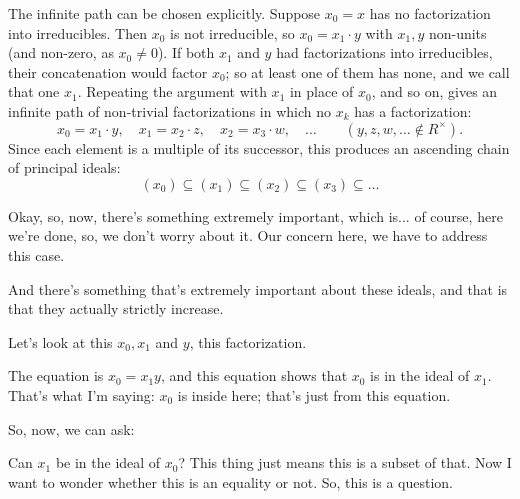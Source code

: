 \begin{proofWrapper}
\begin{content}
\begin{center}
\end{center}

The infinite path can be chosen explicitly. Suppose $x_0 = x$ has no factorization into irreducibles. Then $x_0$ is not irreducible, so $x_0 = x_1 \cdot y$ with $x_1, y$ non-units (and non-zero, as $x_0 \neq 0$). If both $x_1$ and $y$ had factorizations into irreducibles, their concatenation would factor $x_0$; so at least one of them has none, and we call that one $x_1$. Repeating the argument with $x_1$ in place of $x_0$, and so on, gives an infinite path of non-trivial factorizations in which no $x_k$ has a factorization:
\begin{equation}\label{eq:part3-infinite-factorization-chain}
x_0 = x_1 \cdot y, \quad x_1 = x_2 \cdot z, \quad x_2 = x_3 \cdot w, \quad \dots \qquad (y, z, w, \ldots \notin R^\times).
\end{equation}
Since each element is a multiple of its successor, this produces an ascending chain of principal ideals:
\begin{equation}\label{eq:part3-ascending-chain-prelim}
(x_0) \subseteq (x_1) \subseteq (x_2) \subseteq (x_3) \subseteq \dots
\end{equation}
\end{content}

\begin{speech}[01:06:02 - 01:07:12]
Okay, so, now, there's something extremely important, which is... of course, here we're done, so, we don't worry about it. Our concern here, we have to address this case. 

And there's something that's extremely important about these ideals, and that is that they actually strictly increase. 

Let's look at this $x_0, x_1$ and $y$, this factorization. 

The equation is $x_0 = x_1 y$, and this equation shows that $x_0$ is in the ideal of $x_1$. That's what I'm saying: $x_0$ is inside here; that's just from this equation.

So, now, we can ask: 

Can $x_1$ be in the ideal of $x_0$? This thing just means this is a subset of that. Now I want to wonder whether this is an equality or not. So, this is a question.
\end{speech}


\end{proofWrapper}
